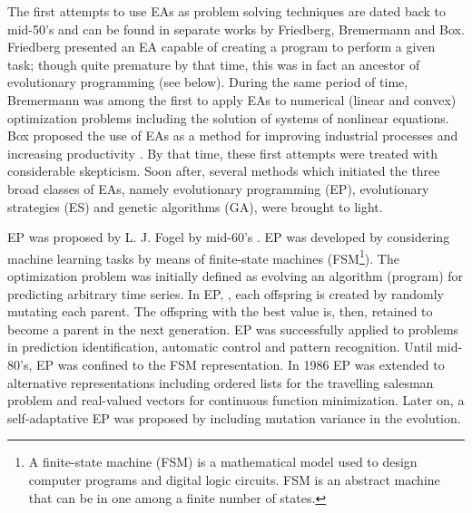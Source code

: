 The first attempts to use EAs as problem solving techniques are dated back to mid-50's and can be found in separate works by Friedberg, Bremermann and Box. Friedberg \cite{Friedberg:1958:LMP:1662346.1662347, Friedberg:1959:LMP:1661923.1661930} presented an EA capable of creating a program to perform a given task; though quite premature by that time, this was in fact an ancestor of evolutionary programming (see below). During the same period of time, Bremermann \cite{Bremermann_62} was among the first to apply EAs to numerical (linear and convex) optimization problems including the solution of systems of nonlinear equations. Box proposed the use of EAs as a method for improving industrial processes and increasing productivity \cite{Box57a,BoDr98a}. By that time, these first attempts were treated with considerable skepticism. Soon after, several methods which initiated the three broad classes of EAs, namely evolutionary programming (EP), evolutionary strategies (ES) and genetic algorithms (GA), were brought to light.

EP was proposed by L. J. Fogel by mid-60's  \cite{fogel62,fogel64,fogel66}. EP was developed by considering machine learning tasks by means of finite-state machines (FSM\footnote{A finite-state machine (FSM) is a mathematical model used to design computer programs and digital logic circuits. FSM is an abstract machine that can be in one among a finite number of states.}). The optimization problem was  initially defined as evolving an algorithm (program) for predicting arbitrary time series.  In EP,  \cite{fogel66}, each offspring is created by randomly mutating each parent. The offspring with the best value is, then, retained to become a parent in the next generation. EP was successfully applied to problems in prediction identification, automatic control and pattern recognition. Until mid-80's, EP was confined to the FSM representation. In 1986 EP was extended to alternative representations including ordered lists for the travelling salesman problem and real-valued vectors for continuous function minimization. Later on, a self-adaptative EP \cite{fogel95} was proposed by including mutation variance in the evolution.

